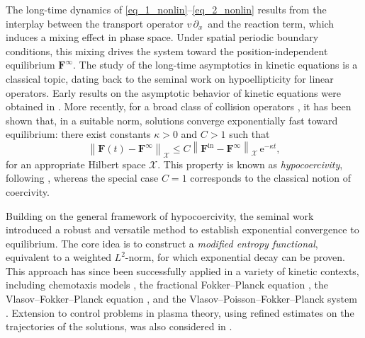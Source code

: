 \documentclass[reqno]{amsart}
\newcommand{\dx}{\,\partial_x\, }
\newcommand{\Fbf}{\mathbf{F}}
\newcommand{\e}{\,\mathrm{e}}
\newcommand{\tin}{{\mathrm{in}}}
\numberwithin{equation}{section}
\begin{document}


The long-time dynamics of \eqref{eq_1_nonlin}--\eqref{eq_2_nonlin} results from the interplay between the transport operator $v\dx$ and the reaction term, which induces a mixing effect in phase space. Under spatial periodic boundary conditions, this mixing drives the system toward the position-independent equilibrium $\Fbf^\infty$. The study of the long-time asymptotics in kinetic equations is a classical topic, dating back to the seminal work \cite{Hoermander1967} on hypoellipticity for linear operators. Early results on the asymptotic behavior of kinetic equations were obtained in \cite{BensoussanLionsPapanicolaou1979}. More recently, for a broad class of collision operators \cite{HerauNier2004, Herau2017, DolbeaultMouhotSchmeiser2015, BouinDolbeaultMischlerMouhotSchmeiser2020}, it has been shown that, in a suitable norm, solutions converge exponentially fast toward equilibrium: there exist constants $\kappa > 0$ and $C > 1$ such that
\begin{equation}
    \left\|\Fbf(t) - \Fbf^\infty\right\|_{\mathcal{X}}
    \le C\left\|\Fbf^{\tin} - \Fbf^\infty\right\|_{\mathcal{X}}
    \e^{-\kappa t},
\end{equation}
for an appropriate Hilbert space $\mathcal{X}$. This property is known as \emph{hypocoercivity}, following \cite{VillaniHypo2009}, whereas the special case $C = 1$ corresponds to the classical notion of coercivity.

Building on the general framework of hypocoercivity, the seminal work \cite{DolbeaultMouhotSchmeiser2015} introduced a robust and versatile method to establish exponential convergence to equilibrium. The core idea is to construct a \emph{modified entropy functional}, equivalent to a weighted $L^2$-norm, for which exponential decay can be proven. This approach has since been successfully applied in a variety of kinetic contexts, including chemotaxis models \cite{CalvezRaoulSchmeiser2015}, the fractional Fokker–Planck equation \cite{BouinDolbeaultLafleche2022}, the Vlasov–Fokker–Planck equation \cite{BouinDolbeaultZiviani2023, BouinZiviani2025}, and the Vlasov–Poisson–Fok\-ker–Planck system \cite{Addala2021}. Extension to control problems in plasma theory, using refined estimates on the trajectories of the solutions, was also considered in \cite{HeHuMo2022}.
\end{document}
